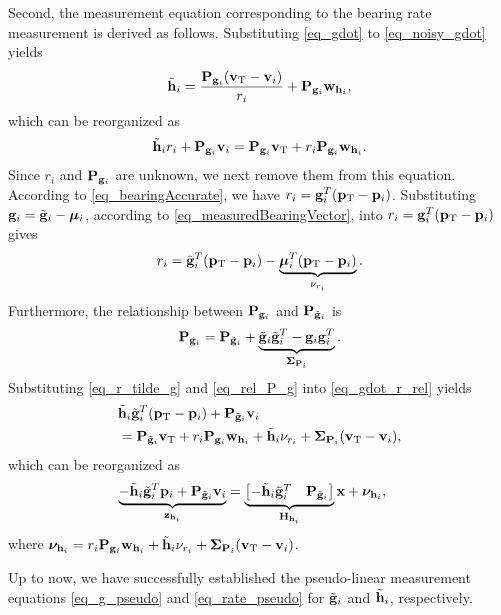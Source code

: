 \documentclass[letterpaper, 10 pt, conference]{ieeeconf}  %
\begin{document}
Second, the measurement equation corresponding to the bearing rate measurement is derived as follows.
Substituting \eqref{eq_gdot} to \eqref{eq_noisy_gdot} yields
\begin{align}
\tilde{\mathbf{h}}_i = \frac{\mathbf{P}_{\mathbf{g}_i}(\mathbf{v}_{{\rm T}}-\mathbf{v}_i)}{r_i} + \mathbf{P}_{\mathbf{g}_i}\mathbf{w}_{\mathbf{h}_i},
\end{align}
which can be reorganized as
\begin{align}
\tilde{\mathbf{h}}_ir_i + \mathbf{P}_{\mathbf{g}_i}\mathbf{v}_i = \mathbf{P}_{\mathbf{g}_i}\mathbf{v}_{{\rm T}} + r_i\mathbf{P}_{\mathbf{g}_i}\mathbf{w}_{\mathbf{h}_i}.\label{eq_gdot_r_rel}
\end{align}
Since $r_i$ and $\mathbf{P}_{\mathbf{g}_i}$ are unknown, we next remove them from this equation. According to \eqref{eq_bearingAccurate}, we have $r_i =\mathbf{g}_i^T(\mathbf{p}_{\rm T} - \mathbf{p}_i)$. Substituting $\mathbf{g}_i=\tilde{\mathbf{g}}_i -\boldsymbol{\mu}_i$, according to \eqref{eq_measuredBearingVector}, into $r_i =\mathbf{g}_i^T(\mathbf{p}_{\rm T} - \mathbf{p}_i)$ gives
\begin{align}
r_i = \tilde{\mathbf{g}}_i^T(\mathbf{p}_{\rm T} - \mathbf{p}_i) - \underbrace{\boldsymbol{\mu}_i^T(\mathbf{p}_{\rm T} - \mathbf{p}_i)}_{\nu_{r_i}}.\label{eq_r_tilde_g}
\end{align}
Furthermore, the relationship between $\mathbf{P}_{\mathbf{g}_i}$ and $\mathbf{P}_{\tilde{\mathbf{g}}_i}$ is
\begin{align}
\mathbf{P}_{\mathbf{g}_i} = \mathbf{P}_{\tilde{\mathbf{g}}_i} + \underbrace{\tilde{\mathbf{g}}_i\tilde{\mathbf{g}}_i^T - \mathbf{g}_i\mathbf{g}_i^T}_{\boldsymbol{\Sigma}_{\mathbf{P}_i}}.\label{eq_rel_P_g}
\end{align}
Substituting \eqref{eq_r_tilde_g} and \eqref{eq_rel_P_g} into \eqref{eq_gdot_r_rel} yields
\begin{align}
& \tilde{\mathbf{h}}_i\tilde{\mathbf{g}}_i^T(\mathbf{p}_{\rm T} - \mathbf{p}_i) + \mathbf{P}_{\tilde{\mathbf{g}}_i}\mathbf{v}_i \\
& = \mathbf{P}_{\tilde{\mathbf{g}}_i}\mathbf{v}_{\rm T} + r_i\mathbf{P}_{\mathbf{g}_i}\mathbf{w}_{\mathbf{h}_i} + \tilde{\mathbf{h}}_i\nu_{r_i} + \boldsymbol{\Sigma}_{\mathbf{P}_i}(\mathbf{v}_{\rm T} - \mathbf{v}_i),
\end{align}
which can be reorganized as
\begin{align}
\underbrace{-\tilde{\mathbf{h}}_i\tilde{\mathbf{g}}_i^T\mathbf{p}_i + \mathbf{P}_{\tilde{\mathbf{g}}_i}\mathbf{v}_i}_{\mathbf{z}_{\mathbf{h}_i}} & = \underbrace{\begin{bmatrix}
-\tilde{\mathbf{h}}_i\tilde{\mathbf{g}}_i^T& \mathbf{P}_{\tilde{\mathbf{g}}_i}
\end{bmatrix}}_{\mathbf{H}_{\mathbf{h}_i}}\mathbf{x}  + \boldsymbol{\nu}_{\mathbf{h}_i},\label{eq_rate_pseudo}
\end{align}
where $\boldsymbol{\nu}_{\mathbf{h}_i} = r_i\mathbf{P}_{\mathbf{g}_i}\mathbf{w}_{\mathbf{h}_i} + \tilde{\mathbf{h}}_i\nu_{r_i}+ \boldsymbol{\Sigma}_{\mathbf{P}_i}(\mathbf{v}_{\rm T} - \mathbf{v}_i)$.


Up to now, we have successfully established the pseudo-linear measurement equations \eqref{eq_g_pseudo} and \eqref{eq_rate_pseudo} for $\tilde{\mathbf{g}}_i$ and $\tilde{\mathbf{h}}_i$, respectively. 
\end{document}

